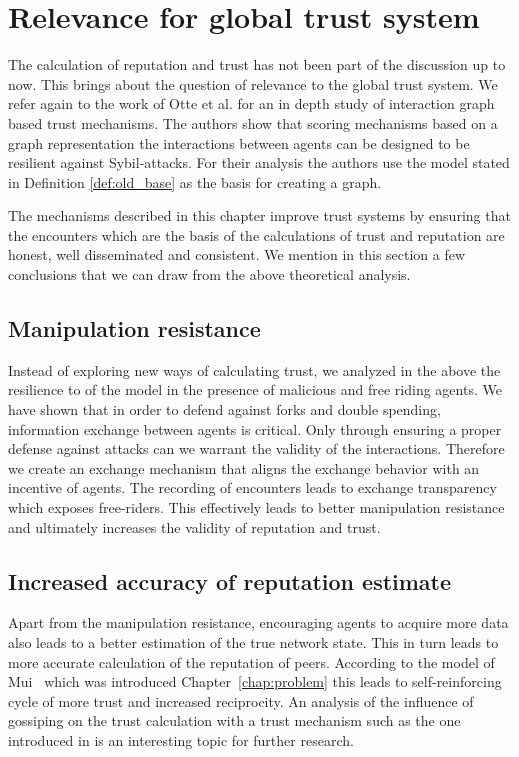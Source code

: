 \section{Relevance for global trust system}
\label{sec:relevance}
The calculation of reputation and trust has not been part of the discussion up to now.
This brings about the question of relevance to the global trust system. We refer again to the work
of Otte et al. for an in depth study of interaction graph based trust mechanisms.
The authors show that scoring mechanisms based on a graph representation the interactions between 
agents can be designed to be resilient against Sybil-attacks. For their analysis the authors use the
model stated in Definition \ref{def:old_base} as the basis for creating a graph. 

The mechanisms described in this chapter improve trust systems by ensuring that the encounters which
are the basis of the calculations of trust and reputation are honest, well disseminated and consistent.
We mention in this section a few conclusions that we can draw from the above theoretical analysis.

\subsection{Manipulation resistance}
Instead of exploring new ways of calculating trust, we analyzed in the above the resilience to of 
the model in the presence of malicious and free riding agents. We have shown that in order to defend
against forks and double spending, information exchange between agents is critical. Only through
ensuring a proper defense against attacks can we warrant the validity of the interactions. Therefore
we create an exchange mechanism that aligns the exchange behavior with an incentive of agents. The
recording of encounters leads to exchange transparency which exposes free-riders. This effectively 
leads to better manipulation resistance and ultimately increases the validity of reputation and 
trust.

\subsection{Increased accuracy of reputation estimate}
Apart from the manipulation resistance, encouraging agents to acquire more data also leads to a
better estimation of the true network state. This in turn leads to more accurate calculation of 
the reputation of peers. According to the model of Mui~\cite{mui2002computational} which was 
introduced Chapter~\ref{chap:problem} this leads to self-reinforcing cycle of more trust and 
increased reciprocity. An analysis of the influence of gossiping on the trust calculation with a
trust mechanism such as the one introduced in \cite{OTTE2017} is an interesting topic for further 
research.

